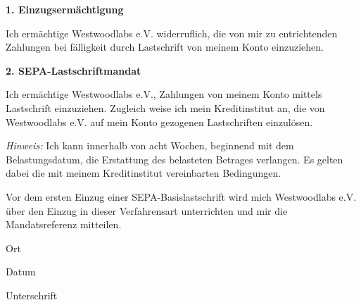 \documentclass[ngerman,a4paper]{article}
\newcommand{\infoInput}[2][8cm]{\stepcounter{infoLineNum}%
	\makebox[((#1)+0.1in)][l]{\makebox[0pt][l]{\kern4pt\raisebox{.75ex}{\TextField[height=12bp,width=#1,name=name\theinfoLineNum,altname={#2},borderwidth=0,tabkey=name\theinfoLineNum]{\ignorespaces}}}\dotfill}}
\newcommand{\infoInputDate}[2][3cm]{\stepcounter{infoLineNum}%
	\makebox[((#1)+0.1in)][l]{\makebox[0pt][l]{\kern4pt\raisebox{.75ex}{\TextField[height=12bp,width=#1,name=name\theinfoLineNum,altname={#2},borderwidth=0,tabkey=name\theinfoLineNum,
				keystroke={AFDate_KeystrokeEx("dd.mm.yyyy")},
				format={AFDate_Format("dd.mm.yyyy")}]{\ignorespaces}}}\dotfill}}
\newcommand{\signarea}{
	\begin{minipage}{0.35\textwidth}
		\begin{center}
			\infoInput[\textwidth]{Ort}
				
			Ort
		\end{center}
	\end{minipage}\hfill
	\begin{minipage}{0.15\textwidth}
		\begin{center}
			\infoInputDate[\textwidth]{Datum}
			
			Datum
		\end{center}
	\end{minipage}\hfill
	\begin{minipage}{0.35\textwidth}
		\begin{center}
			\vspace{12bp}
			\dotfill
			
			Unterschrift
		\end{center}
	\end{minipage}
}
\begin{document}
\begin{Form}
\bigskip
\textbf{1. Einzugsermächtigung}

Ich ermächtige Westwoodlabs e.V. widerruflich, die von mir zu entrichtenden Zahlungen bei fälligkeit durch Lastschrift von meinem Konto einzuziehen.

\bigskip
\textbf{2. SEPA-Lastschriftmandat}

Ich ermächtige Westwoodlabs e.V., Zahlungen von meinem Konto mittels Lastschrift einzuziehen. 
Zugleich weise ich mein Kreditinstitut an, die von Westwoodlabs e.V. auf mein Konto gezogenen Lastschriften einzulösen.


\emph{Hinweis:} Ich kann innerhalb von acht Wochen, beginnend mit dem Belastungsdatum, die Erstattung des belasteten Betrages verlangen. Es gelten dabei die mit meinem Kreditinstitut vereinbarten Bedingungen.

\bigskip
Vor dem ersten Einzug einer SEPA-Basislastschrift wird mich Westwoodlabs e.V. über den Einzug in dieser Verfahrensart unterrichten und mir die Mandatsreferenz mitteilen.\\

\vspace{50pt}

\signarea
\end{Form}
\end{document}
